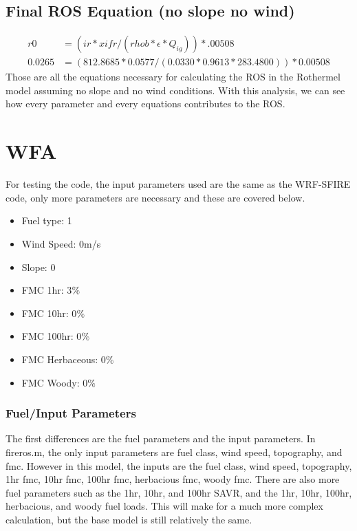 \documentclass{article}
\begin{document}
\subsection{Final ROS Equation (no slope no wind)}
\begin{equation}
	\begin{split}
		r0 &= (ir*xifr/(rhob * \epsilon *Q_{ig})) * .00508 \\
		0.0265 &= (812.8685 * 0.0577 / (0.0330 * 0.9613 * 283.4800)) * 0.00508
	\end{split}
\end{equation}
Those are all the equations necessary for calculating the ROS in the Rothermel model assuming no slope and no wind conditions. With this analysis, we can see how every parameter and every equations contributes to the ROS. 
\section{WFA}

For testing the code, the input parameters used are the same as the WRF-SFIRE code, only more parameters are necessary and these are covered below. 
\begin{itemize}
	\item Fuel type: 1
	\item Wind Speed: 0m/s
	\item Slope: 0
	\item FMC 1hr: 3$\%$
	\item FMC 10hr: 0$\%$
	\item FMC 100hr: 0$\%$
	\item FMC Herbaceous: 0$\%$
	\item FMC Woody: 0$\%$
\end{itemize}
\subsubsection{Fuel/Input Parameters}
The first differences are the fuel parameters and the input parameters. In fire\textunderscore ros.m, the only input parameters are fuel class, wind speed, topography, and fmc. However in this model, the inputs are the fuel class, wind speed, topography, 1hr fmc, 10hr fmc, 100hr fmc, herbacious fmc, woody fmc. There are also more fuel parameters such as the 1hr, 10hr, and 100hr SAVR, and the 1hr, 10hr, 100hr, herbacious, and woody fuel loads. This will make for a much more complex calculation, but the base model is still relatively the same. 
\end{document}
